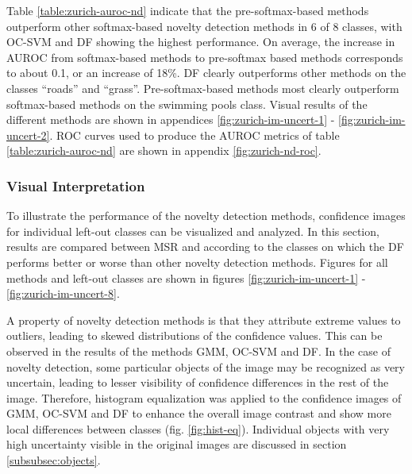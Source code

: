 \documentclass[10pt]{article}
\begin{document}
Table \ref{table:zurich-auroc-nd} indicate that the pre-softmax-based methods outperform other softmax-based novelty detection methods in 6 of 8 classes, with \gls{OC-SVM} and \gls{DF} showing the highest performance. On average, the increase in AUROC from softmax-based methods to pre-softmax based methods corresponds to about 0.1, or an increase of 18\%.  \gls{DF} clearly outperforms other methods on the classes ``roads'' and ``grass''. Pre-softmax-based methods most clearly outperform softmax-based methods on the swimming pools class. Visual results of the different methods are shown in appendices \ref{fig:zurich-im-uncert-1} - \ref{fig:zurich-im-uncert-2}. \gls{ROC} curves used to produce the \gls{AUROC} metrics of table \ref{table:zurich-auroc-nd} are shown in appendix \ref{fig:zurich-nd-roc}.

\subsubsection{Visual Interpretation}

To illustrate the performance of the novelty detection methods, confidence images for individual left-out classes can be visualized and analyzed. In this section, results are compared between \gls{MSR} and  according to the classes on which the \acrlong{DF} performs better or worse than other novelty detection methods. Figures for all methods and left-out classes are shown in figures \ref{fig:zurich-im-uncert-1} - \ref{fig:zurich-im-uncert-8}.

A property of novelty detection methods is that they attribute extreme values to outliers, leading to skewed distributions of the confidence values. This can be observed in the results of the methods \gls{GMM}, \gls{OC-SVM} and \gls{DF}. In the case of novelty detection, some particular objects of the image may be recognized as very uncertain, leading to lesser visibility of confidence differences in the rest of the image. Therefore, histogram equalization was applied to the confidence images of \gls{GMM}, \gls{OC-SVM} and \gls{DF} to enhance the overall image contrast and show more local differences between classes \cite{Gonzlez2012DigitalIP} (fig.  \ref{fig:hist-eq}). Individual objects with very high uncertainty visible in the original images are discussed in section \ref{subsubsec:objects}.
\end{document}
